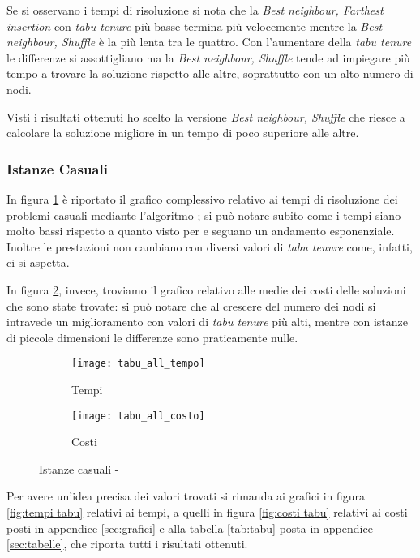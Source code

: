 Se si osservano i tempi di risoluzione si nota che la \emph{Best neighbour, Farthest insertion} con \emph{tabu tenure} più basse termina più velocemente mentre la \emph{Best neighbour, Shuffle} è la più lenta tra le quattro.
Con l'aumentare della \emph{tabu tenure} le differenze si assottigliano ma la \emph{Best neighbour, Shuffle} tende ad impiegare più tempo a trovare la soluzione rispetto alle altre, soprattutto con un alto numero di nodi.

Visti i risultati ottenuti ho scelto la versione \emph{Best neighbour, Shuffle} che riesce a calcolare la soluzione migliore in un tempo di poco superiore alle altre.


\subsubsection{Istanze Casuali}
In figura \ref{fig:all tempi tabu} è riportato il grafico complessivo relativo ai tempi di risoluzione dei problemi casuali mediante l'algoritmo \tabu; si può notare subito come i tempi siano molto bassi rispetto a quanto visto per  e seguano un andamento esponenziale.
Inoltre le prestazioni non cambiano con diversi valori di \emph{tabu tenure} come, infatti, ci si aspetta.

In figura \ref{fig:all costi tabu}, invece, troviamo il grafico relativo alle medie dei costi delle soluzioni che sono state trovate: si può notare che al crescere del numero dei nodi si intravede un miglioramento con valori di \emph{tabu tenure} più alti, mentre con istanze di piccole dimensioni le differenze sono praticamente nulle.

\begin{figure}[H]
	\centering
	\begin{subfigure}[b]{.45\textwidth}
			\texttt{[image: tabu\_all\_tempo]}
			\caption{Tempi}
			\label{fig:all tempi tabu}
	\end{subfigure}
	\quad
	\begin{subfigure}[b]{.45\textwidth}
			\texttt{[image: tabu\_all\_costo]}
			\caption{Costi}
			\label{fig:all costi tabu}
	\end{subfigure}
	\caption{Istanze casuali - \tabu}
	\label{fig:all tempi costi tabu}
\end{figure}

Per avere un'idea precisa dei valori trovati si rimanda ai grafici in figura \ref{fig:tempi tabu} relativi ai tempi, a quelli in figura \ref{fig:costi tabu} relativi ai costi posti in appendice \ref{sec:grafici} e alla tabella \ref{tab:tabu} posta in appendice \ref{sec:tabelle}, che riporta tutti i risultati ottenuti.

